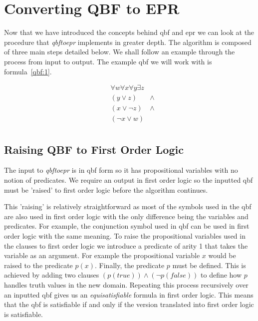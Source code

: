 \chapter{Converting QBF to EPR} \label{chapter:qbftoepr}
Now that we have introduced the concepts behind \gls{qbf} and \gls{epr} we can look at the procedure that \textit{qbftoepr} implements in greater depth. The algorithm is composed of three main steps detailed below. We shall follow an example through the process from input to output.
The example \gls{qbf} we will work with is formula~\ref{qbf:1}.

\begin{equation} \label{qbf:1}
\begin{aligned}
&\forall w \forall x \forall y \exists z \\
&(y \lor z) &\land\\
&(x \lor \neg z) &\land\\
&(\neg x \lor w)\\
\end{aligned}
\end{equation}

\section{Raising QBF to First Order Logic}
The input to \textit{qbftoepr} is in \gls{qbf} form so it has propositional variables with no notion of predicates. We require an output in first order logic so the inputted \gls{qbf} must be 'raised' to first order logic before the algorithm continues.

This 'raising' is relatively straightforward as most of the symbols used in the \gls{qbf} are also used in first order logic with the only difference being the variables and predicates. For example, the conjunction symbol used in \gls{qbf} can be used in first order logic with the same meaning. To raise the propositional variables used in the clauses to first order logic we introduce a predicate of arity 1 that takes the variable as an argument. For example the propositional variable $x$ would be raised to the predicate $p(x)$. Finally, the predicate $p$ must be defined. This is achieved by adding two clauses $(p(true)) \land (\neg p(false))$ to define how $p$ handles truth values in the new domain. Repeating this process recursively over an inputted \gls{qbf} gives us an \textit{equisatisfiable} formula in first order logic. This means that the \gls{qbf} is satisfiable if and only if the version translated into first order logic is satisfiable.

